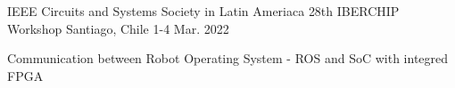 

\begin{cventries}

  \cventry
    {IEEE Circuits and Systems Society in Latin Ameriaca} %
    {28th IBERCHIP Workshop} %
    {Santiago, Chile} %
    {1-4 Mar. 2022} %
    {
      \begin{cvitems} %
        \item {Communication between Robot Operating System - ROS and SoC with integred FPGA}
      \end{cvitems}
    }


\end{cventries}
